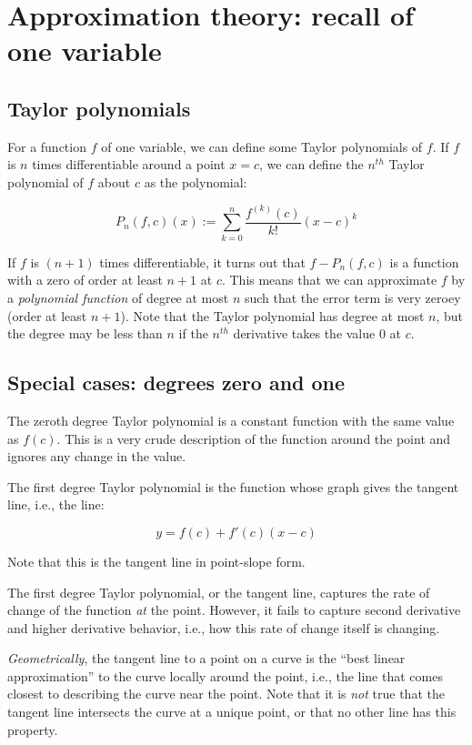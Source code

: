 \documentclass[10pt]{amsart}
\begin{document}
\section{Approximation theory: recall of one variable}

\subsection{Taylor polynomials}

For a function $f$ of one variable, we can define some Taylor
polynomials of $f$. If $f$ is $n$ times differentiable around a point
$x = c$, we can define the $n^{th}$ Taylor polynomial of $f$ about $c$
as the polynomial:

$$P_n(f,c)(x) := \sum_{k=0}^n \frac{f^{(k)}(c)}{k!}(x - c)^k$$

If $f$ is $(n + 1)$ times differentiable, it turns out that $f -
P_n(f,c)$ is a function with a zero of order at least $n + 1$ at
$c$. This means that we can approximate $f$ by a {\em polynomial
function} of degree at most $n$ such that the error term is very
zeroey (order at least $n + 1$). Note that the Taylor polynomial has
degree at most $n$, but the degree may be less than $n$ if the
$n^{th}$ derivative takes the value $0$ at $c$.

\subsection{Special cases: degrees zero and one}

The zeroth degree Taylor polynomial is a constant function with the
same value as $f(c)$. This is a very crude description of the function
around the point and ignores any change in the value.

The first degree Taylor polynomial is the function whose graph gives
the tangent line, i.e., the line:

$$y = f(c) + f'(c)(x - c)$$

Note that this is the tangent line in point-slope form.

The first degree Taylor polynomial, or the tangent line, captures the
rate of change of the function {\em at} the point. However, it fails
to capture second derivative and higher derivative behavior, i.e., how
this rate of change itself is changing.

{\em Geometrically}, the tangent line to a point on a curve is the
``best linear approximation'' to the curve locally around the point,
i.e., the line that comes closest to describing the curve near the
point. Note that it is {\em not} true that the tangent line intersects
the curve at a unique point, or that no other line has this property.
\end{document}
